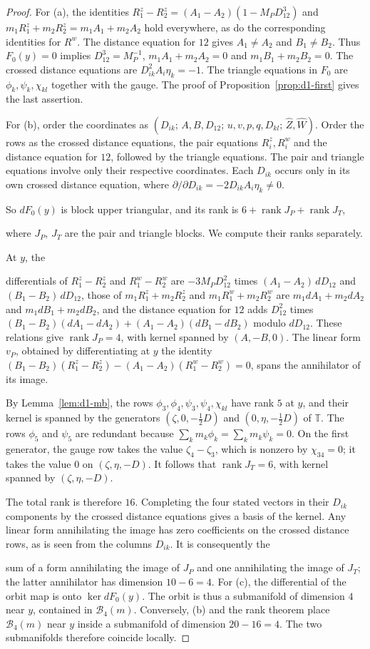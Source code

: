 \documentclass[Threeside,11pt]{article}
\theoremstyle{definition}
\theoremstyle{remark}
\numberwithin{equation}{section}
\theoremstyle{remark}
\begin{document}
\begin{proof}
{For (a), the identities $R^z_1-R^z_2=(A_1-A_2)(1-M_PD_{12}^3)$ and
$m_1R^z_1+m_2R^z_2=m_1A_1+m_2A_2$ hold everywhere, as do the corresponding identities for
$R^w$. The distance equation for $12$ gives $A_1\ne A_2$ and $B_1\ne B_2$.
Thus $F_0(y)=0$ implies $D_{12}^3=M_P^{-1}$, $m_1A_1+m_2A_2=0$ and $m_1B_1+m_2B_2=0$.
The crossed distance equations are $D_{ik}^2A_i\eta_k=-1$.
The triangle equations in $F_0$ are $\phi_k,\psi_k,\chi_{kl}$ together with the gauge.
The proof of Proposition~\ref{prop:d1-first} gives the last assertion.

For (b), order the coordinates as $(D_{ik};\,A,B,D_{12};\,u,v,p,q,D_{kl};\,\hat Z,\hat W)$.
Order the rows as the crossed distance equations, the pair equations $R^z_i,R^w_i$
and the distance equation for $12$, followed by the triangle equations.
The pair and triangle equations involve only their respective coordinates.
Each $D_{ik}$ occurs only in its own crossed distance equation, where
$\partial/\partial D_{ik}=-2D_{ik}A_i\eta_k\ne0$.}
{So $dF_0(y)$ is block upper triangular, and its rank is $6+\operatorname{rank}J_P+
\operatorname{rank}J_T$}, {where $J_P$, $J_T$ are the pair and triangle blocks.
We compute their ranks separately.

At $y$, the}
differentials of $R^z_1-R^z_2$ and $R^w_1-R^w_2$ are $-3M_PD_{12}^2$ times
$(A_1-A_2)\,dD_{12}$ and $(B_1-B_2)\,dD_{12}$, those of $m_1R^z_1+m_2R^z_2$ and $m_1R^w_1+m_2R^w_2$
are $m_1dA_1+m_2dA_2$ and $m_1dB_1+m_2dB_2$, and the distance equation for $12$ adds $D_{12}^2$ times
$(B_1-B_2)(dA_1-dA_2)+(A_1-A_2)(dB_1-dB_2)$ modulo $dD_{12}$.
{These relations give $\operatorname{rank}J_P=4$, with kernel spanned by
$(A,-B,0)$. The linear form $v_P$, obtained by differentiating at $y$ the identity}
{$(B_1-B_2)(R^z_1-R^z_2)-(A_1-A_2)(R^w_1-R^w_2)=0$, spans the annihilator of its image.}

{By Lemma~\ref{lem:d1-mb}, the rows $\phi_3,\phi_4,\psi_3,\psi_4,\chi_{kl}$ have rank $5$
at $y$, and their kernel is spanned by the generators $(\zeta,0,-\frac12D)$ and
$(0,\eta,-\frac12D)$ of $\mathbb T$.
The rows $\phi_5$ and $\psi_5$ are redundant because $\sum_km_k\phi_k=\sum_km_k\psi_k=0$.
On the first generator, the gauge row takes the value $\zeta_4-\zeta_3$,
which is nonzero by $\chi_{34}=0$; it takes the value $0$ on $(\zeta,\eta,-D)$.
It follows that $\operatorname{rank}J_T=6$, with kernel spanned by $(\zeta,\eta,-D)$.

The total rank is therefore $16$. Completing the four stated vectors in their $D_{ik}$
components by the crossed distance equations gives a basis of the kernel.
Any linear form annihilating the image has zero coefficients on the crossed distance rows,
as is seen from the columns $D_{ik}$. It is consequently the}
{sum of a form annihilating the image of $J_P$ and one annihilating the image of $J_T$;
the latter annihilator has dimension $10-6=4$.}
{For (c), the differential of the orbit map is onto $\ker dF_0(y)$.
The orbit is thus a submanifold of dimension $4$ near $y$, contained in $\mathcal B_4(m)$.
Conversely, (b) and the rank theorem place $\mathcal B_4(m)$ near $y$ inside a submanifold
of dimension $20-16=4$. The two submanifolds therefore coincide locally.}
\end{proof}
\end{document}
